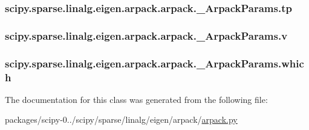 \subsubsection[{tp}]{\setlength{\rightskip}{0pt plus 5cm}scipy.\+sparse.\+linalg.\+eigen.\+arpack.\+arpack.\+\_\+\+Arpack\+Params.\+tp}\label{classscipy_1_1sparse_1_1linalg_1_1eigen_1_1arpack_1_1arpack_1_1__ArpackParams_a6503920a18ec478f141543f7ee4d48b0}
\hypertarget{classscipy_1_1sparse_1_1linalg_1_1eigen_1_1arpack_1_1arpack_1_1__ArpackParams_a18dd692a626ec3c49c16dbbde92a4a0e}{}
\subsubsection[{v}]{\setlength{\rightskip}{0pt plus 5cm}scipy.\+sparse.\+linalg.\+eigen.\+arpack.\+arpack.\+\_\+\+Arpack\+Params.\+v}\label{classscipy_1_1sparse_1_1linalg_1_1eigen_1_1arpack_1_1arpack_1_1__ArpackParams_a18dd692a626ec3c49c16dbbde92a4a0e}
\hypertarget{classscipy_1_1sparse_1_1linalg_1_1eigen_1_1arpack_1_1arpack_1_1__ArpackParams_a36cf48795ab2bad38250cc0ef29c215b}{}
\subsubsection[{which}]{\setlength{\rightskip}{0pt plus 5cm}scipy.\+sparse.\+linalg.\+eigen.\+arpack.\+arpack.\+\_\+\+Arpack\+Params.\+which}\label{classscipy_1_1sparse_1_1linalg_1_1eigen_1_1arpack_1_1arpack_1_1__ArpackParams_a36cf48795ab2bad38250cc0ef29c215b}


The documentation for this class was generated from the following file\+:\begin{DoxyCompactItemize}
\item 
packages/scipy-\/0../scipy/sparse/linalg/eigen/arpack/\hyperlink{arpack_8py}{arpack.\+py}\end{DoxyCompactItemize}
